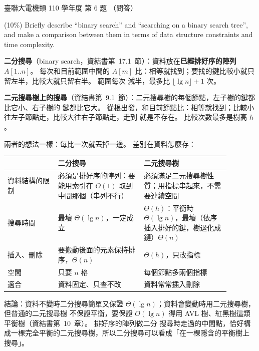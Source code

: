 \begin{pastexam}[label={px:ust-110-ee-ds-06}]{臺聯大電機類 110 學年度 第 6 題}
（問答）

(10\%) Briefly describe ``binary search'' and ``searching on a binary search tree'', and make a
comparison between them in terms of data structure constraints and time complexity.
\end{pastexam}

\begin{pastsoln}
\textbf{二分搜尋}（binary search，資結書第~17.1~節）：資料放在\textbf{已經排好序的陣列} $A[1..n]$。
每次和目前範圍中間的 $A[m]$ 比：相等就找到；要找的鍵比較小就只留左半，比較大就只留右半。 範圍每次
減半，最多比 $\lfloor \lg n \rfloor + 1$ 次。

\textbf{二元搜尋樹上的搜尋}（資結書第~9.1~節）：二元搜尋樹的每個節點，左子樹的鍵都比它小、右子樹的
鍵都比它大。 從根出發，和目前節點比：相等就找到；比較小往左子節點走，比較大往右子節點走，走到 \NIL
就是不存在。 比較次數最多是樹高 $h$。

兩者的想法一樣：每比一次就丟掉一邊。 差別在資料怎麼存：
\begin{center}
\begin{tabular}{p{0.2\linewidth}p{0.34\linewidth}p{0.34\linewidth}}
\toprule
& 二分搜尋 & 二元搜尋樹 \\
\midrule
資料結構的限制 & 必須是排好序的陣列：要能用索引在 $O(1)$ 取到中間那個（串列不行） & 必須滿足二元搜尋樹性質；用指標串起來，不需要連續空間 \\
搜尋時間 & 最壞 $\Theta(\lg n)$，一定成立 & $\Theta(h)$：平衡時 $\Theta(\lg n)$，最壞（依序插入排好的鍵，樹退化成鏈）$\Theta(n)$ \\
插入、刪除 & 要搬動後面的元素保持排序，$\Theta(n)$ & $\Theta(h)$，只改指標 \\
空間 & 只要 $n$ 格 & 每個節點多兩個指標 \\
適合 & 資料固定、只查不改 & 資料常常插入刪除 \\
\bottomrule
\end{tabular}
\end{center}

結論：資料不變時二分搜尋簡單又保證 $\Theta(\lg n)$；資料會變動時用二元搜尋樹，但普通的二元搜尋樹
不保證平衡，要保證 $O(\lg n)$ 得用 AVL 樹、紅黑樹這類平衡樹（資結書第~10~章）。 排好序的陣列做二分
搜尋時走過的中間點，恰好構成一棵完全平衡的二元搜尋樹，所以二分搜尋可以看成「在一棵隱含的平衡樹上
搜尋」。
\end{pastsoln}
